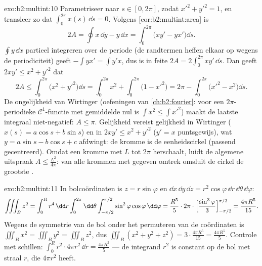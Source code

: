 \begin{solution}{exo:b2:multint:10}
Parametriseer naar  $s \in [0, 2\pi]$, zodat $x'^2 +
y'^2 = 1$, en transleer zo dat $\int_0^{2\pi} x(s)\,\dd s = 0$.
Volgens \cref{cor:b2:multint:area} is
\[
2A = \oint x\,\dd y - y\,\dd x
= \int_0^{2\pi}\bigl(xy' - yx'\bigr)\dd s .
\]
$\oint y\,\dd x$ partieel integreren over de periode (de randtermen
heffen elkaar op wegens de periodiciteit) geeft $-\int yx' = \int
y'x$, dus is in feite $2A = 2\int_0^{2\pi}xy'\,\dd s$. Dan geeft
$2xy' \leq x^2 + y'^2$ dat
\[
2A \leq \int_0^{2\pi}\bigl(x^2 + y'^2\bigr)\dd s
= \int_0^{2\pi} x^2 + \int_0^{2\pi}\bigl(1 - x'^2\bigr)
= 2\pi - \int_0^{2\pi}\bigl(x'^2 - x^2\bigr)\dd s .
\]
De ongelijkheid van Wirtinger (oefeningen van
\cref{ch:b2:fourier}: voor een $2\pi$-periodieke
$\mathcal{C}^1$-functie met gemiddelde nul is $\int x^2 \leq \int
x'^2$) maakt de laatste integraal niet-negatief: $A \leq \pi$.
Gelijkheid vereist gelijkheid in Wirtinger ($x(s) = a\cos s + b\sin
s$) en in $2xy' \leq x^2 + y'^2$ ($y' = x$ puntsgewijs), wat $y =
a\sin s - b\cos s + c$ afdwingt: de kromme is de eenheidscirkel
(passend gecentreerd). Omdat een kromme met  $L$ tot 
$2\pi$ herschaalt, luidt de algemene uitspraak $A \leq
\frac{L^2}{4\pi}$: van alle  krommen met gegeven omtrek
omsluit de cirkel de grootste .
\end{solution}

\begin{solution}{exo:b2:multint:11}
In bolcoördinaten is $z = r\sin\varphi$ en $\dd x\,\dd y\,\dd z =
r^2\cos\varphi\,\dd r\,\dd\theta\,\dd\varphi$:
\[
\iiint_B z^2
= \int_0^R r^4\,\dd r\int_0^{2\pi}\dd\theta
\int_{-\pi/2}^{\pi/2}\sin^2\varphi\cos\varphi\,\dd\varphi
= \frac{R^5}5\cdot2\pi\cdot
\Bigl[\frac{\sin^3\varphi}3\Bigr]_{-\pi/2}^{\pi/2}
= \frac{4\pi R^5}{15}.
\]
Wegens de symmetrie van de bol onder het permuteren van de
coördinaten is $\iiint_B x^2 = \iiint_B y^2 = \iiint_B z^2$, dus
$\iiint_B(x^2 + y^2 + z^2) = 3\cdot\frac{4\pi R^5}{15} = \frac{4\pi
R^5}5$. Controle met schillen: $\int_0^R r^2\cdot 4\pi r^2\,\dd r =
\frac{4\pi R^5}5$ --- de integrand $r^2$ is constant op de bol met
straal $r$, die  $4\pi r^2$ heeft.
\end{solution}

